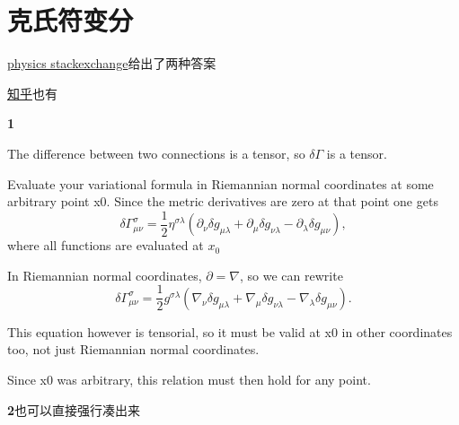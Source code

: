 \documentclass[UTF8]{article}
\begin{document}
	
	
	
\section{克氏符变分}
	\href{https://physics.stackexchange.com/questions/462686/whats-the-variation-of-the-christoffel-symbols-with-respect-to-the-metric}{physics stackexchange}给出了两种答案
		
	\href{https://zhuanlan.zhihu.com/p/354190513}{知乎}也有
	
	\textbf{1}
	
	The difference between two connections is a tensor, so $\delta\Gamma$ is a tensor.
	
	Evaluate your variational formula in Riemannian normal coordinates at some arbitrary point x0. Since the metric derivatives are zero at that point one gets
\begin{equation}
	\delta\Gamma^\sigma_{\mu\nu}=\frac{1}{2}\eta^{\sigma\lambda}(\partial_\nu\delta g_{\mu\lambda}+\partial_\mu\delta g_{\nu\lambda}-\partial_\lambda\delta g_{\mu\nu}),
\end{equation}
	where all functions are evaluated at $ x_0 $
	
	In Riemannian normal coordinates, $ \partial=\nabla $, so we can rewrite
\begin{equation}
	\delta\Gamma^\sigma_{\mu\nu}=\frac{1}{2}g^{\sigma\lambda}(\nabla_\nu\delta g_{\mu\lambda}+\nabla_\mu\delta g_{\nu\lambda}-\nabla_\lambda\delta g_{\mu\nu}).
\end{equation}
	
	This equation however is tensorial, so it must be valid at x0 in other coordinates too, not just Riemannian normal coordinates.
	
	Since x0 was arbitrary, this relation must then hold for any point.

\textbf{2}也可以直接强行凑出来
\end{document}
